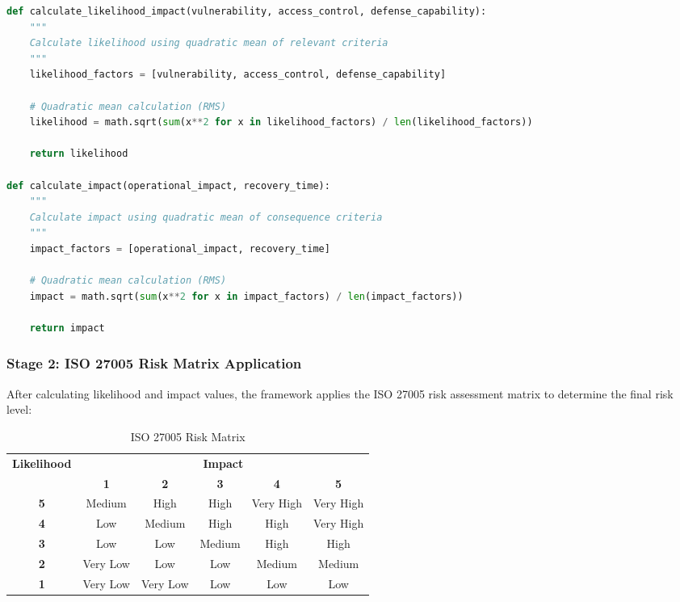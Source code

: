 \documentclass[binding=0.6cm]{sapthesis}
\begin{document}
\begin{lstlisting}[language=Python, caption=Likelihood and Impact Calculation]
def calculate_likelihood_impact(vulnerability, access_control, defense_capability):
    """
    Calculate likelihood using quadratic mean of relevant criteria
    """
    likelihood_factors = [vulnerability, access_control, defense_capability]
    
    # Quadratic mean calculation (RMS)
    likelihood = math.sqrt(sum(x**2 for x in likelihood_factors) / len(likelihood_factors))
    
    return likelihood

def calculate_impact(operational_impact, recovery_time):
    """
    Calculate impact using quadratic mean of consequence criteria
    """
    impact_factors = [operational_impact, recovery_time]
    
    # Quadratic mean calculation (RMS)
    impact = math.sqrt(sum(x**2 for x in impact_factors) / len(impact_factors))
    
    return impact
\end{lstlisting}

\subsubsection{Stage 2: ISO 27005 Risk Matrix Application}

After calculating likelihood and impact values, the framework applies the ISO 27005 risk assessment matrix to determine the final risk level:

\begin{table}[H]
\centering
\caption{ISO 27005 Risk Matrix}
\begin{tabular}{|c|c|c|c|c|c|}
\hline
\multirow{2}{*}{\textbf{Likelihood}} & \multicolumn{5}{c|}{\textbf{Impact}} \\ \cline{2-6}
& \textbf{1} & \textbf{2} & \textbf{3} & \textbf{4} & \textbf{5} \\ \hline
\textbf{5} & Medium & High & High & Very High & Very High \\ \hline
\textbf{4} & Low & Medium & High & High & Very High \\ \hline
\textbf{3} & Low & Low & Medium & High & High \\ \hline
\textbf{2} & Very Low & Low & Low & Medium & Medium \\ \hline
\textbf{1} & Very Low & Very Low & Low & Low & Low \\ \hline
\end{tabular}
\end{table}
\end{document}
